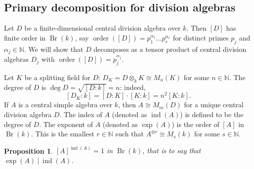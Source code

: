 \documentclass[10pt, a4paper]{article}
\newtheorem{proposition}[thm]{Proposition}
\newcommand{\N}{\mathbb {N}}
\DeclareMathOperator{\brauer}{Br}
\DeclareMathOperator{\ind}{ind}
\DeclareMathOperator{\ord}{order}
\begin{document}
\subsection{Primary decomposition for division algebras}

Let $D$ be a finite-dimensional central division algebra over $k$. 
Then $[D]$ has finite order in $\brauer (k)$, say $\ord ([D]) = p_1 ^{\alpha_1} \dots p_r ^{\alpha_r}$
for distinct primes $p_j$ and $\alpha_j \in \N$.
We will show that $D$ decomposes as a tensor product of central division algebras $D_j$
with $\ord([D]) = p_j^{\alpha_j}$.

Let $K$ be a splitting field for $D$: $D_K = D \otimes_k K \cong M_n (K)$ for some $n\in \N$.
The degree of $D$ is $\deg D = \sqrt{[D: k]} = n$:
indeed, $$[D_K : k] = [D: K] \cdot [K: k] = n^2 [K: k].$$
If $A$ is a central simple algebra over $k$, then $A \cong M_m (D)$
for a unique central division algebra $D$.
The index of $A$ (denoted as $\ind (A)$) is defined to be the degree of $D$.
The exponent of $A$ (denoted as $\exp (A)$) is the order of $[A]$ in $\brauer (k)$.
This is the smallest $r \in \N$ such that $A^{\otimes r} \cong M_s(k)$
for some $s \in \N$. 

\begin{proposition}
  $[A]^{\ind(A)} = 1$ in $\brauer (k)$, that is to say that $\exp (A) \ |\ \ind (A)$.
\end{proposition}
\end{document}
